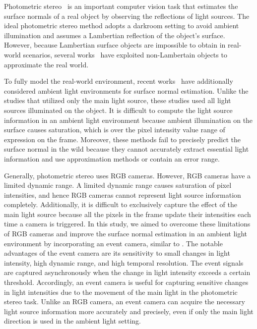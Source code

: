 Photometric stereo~\citep{woodham1980photometric} is an important computer vision task that estimates the surface normals of a real object by observing the reflections of light sources. 
The ideal photometric stereo method adopts a darkroom setting to avoid ambient illumination and assumes a Lambertian reflection of the object's surface. 
However, because Lambertian surface objects are impossible to obtain in real-world scenarios, several works~\citep{ikehata2012robust,ikehata2014photometric,santo2017deep,ikehata2018cnn,chen2018ps,logothetis2021px,zheng2019spline} have exploited non-Lambertain objects to approximate the real world. %

To fully model the real-world environment, recent works~\citep{hung2015photometric, hold2019single} have additionally considered  ambient light environments for surface normal estimation. Unlike the studies that utilized only the main light source, these studies used all light sources illuminated on the object. It is difficult to compute the light source information in an ambient light environment because ambient illumination on the surface causes saturation, which is over the pixel intensity value range of expression on the frame. Moreover, these methods fail to precisely predict the surface normal in the wild because they cannot accurately extract essential light information and use approximation methods or contain an error range.

Generally, photometric stereo uses RGB cameras. However, RGB cameras have a limited dynamic range. A limited dynamic range causes saturation of pixel intensities, and hence RGB cameras cannot represent light source information completely. Additionally, it is difficult to exclusively capture the effect of the main light source because all the pixels in the frame update their intensities each time a camera is triggered. In this study, we aimed to overcome these limitations of RGB cameras and improve the surface normal estimation in an ambient light environment by incorporating an event camera, similar to \citep{lichtsteiner2008128, posch2010qvga, brandli2014240}. The notable advantages of the event camera are its sensitivity to small changes in light intensity, high dynamic range, and high temporal resolution. The event signals are captured asynchronously when the change in light intensity exceeds a certain threshold. Accordingly, an event camera is useful for capturing sensitive changes in light intensities due to the movement of the main light in the photometric stereo task. Unlike an RGB camera, an event camera can acquire the necessary light source information more accurately and precisely, even if only the main light direction is used in the ambient light setting.


